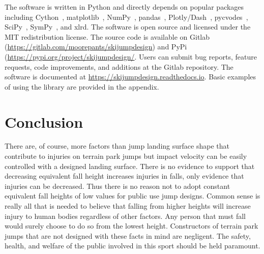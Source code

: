 \documentclass{article}
\begin{document}
The software is written in Python and directly depends on popular packages
including Cython~\cite{Behnel2011}, matplotlib~\cite{Hunter2007},
NumPy~\cite{Oliphant2006}, pandas~\cite{McKinney2020},
Plotly/Dash~\cite{Plotly2015}, pycvodes~\cite{Dahlgren2018},
SciPy~\cite{Virtanen2020}, SymPy~\cite{Meurer2017}, and xlrd.  The software is
open source and licensed under the MIT redistribution license.  The source code
is available on Gitlab (\url{https://gitlab.com/moorepants/skijumpdesign}) and
PyPi (\url{https://pypi.org/project/skijumpdesign/}. Users can submit bug
reports, feature requests, code improvements, and additions at the Gitlab
repository. The software is documented at
\href{https://skijumpdesign.readthedocs.io}{https://skijumpdesign.readthedocs.io}.
Basic examples of using the library are provided in the appendix.

\section{Conclusion}
%
There are, of course, more factors than jump landing surface shape that
contribute to injuries on terrain park jumps but impact velocity can be easily
controlled with a designed landing surface. There is no evidence to support
that decreasing equivalent fall height increases injuries in falls, only
evidence that injuries can be decreased. Thus there is no reason not to adopt
constant equivalent fall heights of low values for public use jump designs.
Common sense is really all that is needed to believe that falling from higher
heights will increase injury to human bodies regardless of other factors. Any
person that must fall would surely choose to do so from the lowest height.
Constructors of terrain park jumps that are not designed with these facts in
mind are negligent. The safety, health, and welfare of the public involved in
this sport should be held paramount.




\appendix
\end{document}
